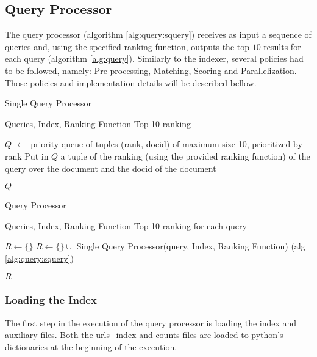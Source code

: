 \documentclass[sigconf,authorversion,nonacm]{acmart}
\begin{document}
\subsection{Query Processor}

The query processor (algorithm \ref{alg:query:squery}) receives as input a sequence of queries and, using the specified ranking function, outputs the top $10$ results for each query (algorithm \ref{alg:query}). Similarly to the indexer, several policies had to be followed, namely: Pre-processing, Matching, Scoring and Parallelization. Those policies and implementation details will be described bellow.


\begin{algorithm}
  \caption{Single Query Processor}\label{alg:query:squery}
  \begin{algorithmic}
    \Require Queries, Index, Ranking Function
    \Ensure Top 10 ranking

    \State $Q$ $\gets$ priority queue of tuples (rank, docid) of maximum size 10, prioritized by rank
    \State Put in $Q$ a tuple of the ranking (using the provided ranking function) of the query over the document and the docid of the document
    \EndFor

    \State \Return $Q$

  \end{algorithmic}
\end{algorithm}

\begin{algorithm}
  \caption{Query Processor}\label{alg:query}
  \begin{algorithmic}
    \Require Queries, Index, Ranking Function
    \Ensure Top 10 ranking for each query

    \State $R \gets \{\}$
    \State $R \gets \{\} \cup$ Single Query Processor(query, Index, Ranking Function) (alg \ref{alg:query:squery})
    \EndFor

    \State \Return $R$

  \end{algorithmic}
\end{algorithm}

\subsubsection{Loading the Index}

The first step in the execution of the query processor is loading the index and auxiliary files. Both the urls\_index and counts files are loaded to python's dictionaries at the beginning of the execution.
\end{document}
